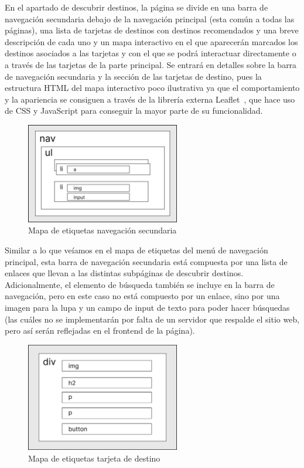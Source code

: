 \documentclass[11pt, a4paper]{book}
\begin{document}
    En el apartado de descubrir destinos, la página se divide en una barra de navegación secundaria debajo de la navegación principal (esta común a todas las páginas), una lista de tarjetas de destinos con destinos recomendados y una breve descripción de cada uno y un mapa interactivo en el que aparecerán marcados los destinos asociados a las tarjetas y con el que se podrá interactuar directamente o a través de las tarjetas de la parte principal. Se entrará en detalles sobre la barra de navegación secundaria y la sección de las tarjetas de destino, pues la estructura HTML del mapa interactivo poco ilustrativa ya que el comportamiento y la apariencia se consiguen a través de la librería externa Leaflet~\cite{leaflet}, que hace uso de CSS y JavaScript para conseguir la mayor parte de su funcionalidad.

	\begin{figure} [H]
		\centering
		\includegraphics[width=0.6\textwidth]{HTML/Etiq-nav-sec.jpg}
		\caption{Mapa de etiquetas navegación secundaria}
	\end{figure}

	Similar a lo que veíamos en el mapa de etiquetas del menú de navegación principal, esta barra de navegación secundaria está compuesta por una lista de enlaces que llevan a las distintas subpáginas de descubrir destinos. Adicionalmente, el elemento de búsqueda también se incluye en la barra de navegación, pero en este caso no está compuesto por un enlace, sino por una imagen para la lupa y un campo de input de texto para poder hacer búsquedas (las cuáles no se implementarán por falta de un servidor que respalde el sitio web, pero así serán reflejadas en el frontend de la página).

	\begin{figure} [H]
		\centering
		\includegraphics[width=0.6\textwidth]{HTML/Etiq-destino.jpg}
		\caption{Mapa de etiquetas tarjeta de destino}
	\end{figure}
\end{document}
